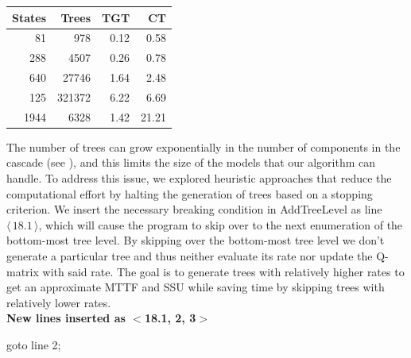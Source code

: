 \documentclass[12pt]{article}
\newcommand{\citeLine}[1]{$\langle \, #1 \, \rangle$}
\begin{document}
\noindent\begin{minipage}[c]{\textwidth}
	\centering
    \begin{tabular}{|r|r|r|r|}
    \hline
	    States & Trees  & TGT	& CT  \\ \hline
	    81    & 978    & 0.12 	& 0.58 \\ \hline
	    288   & 4507   & 0.26	& 0.78 \\ \hline
	    640   & 27746  & 1.64	& 2.48 \\ \hline
	    125   & 321372 & 6.22	& 6.69 \\ \hline
	    1944  & 6328   & 1.42	& 21.21 \\ \hline
	\end{tabular}
	\label{fig:table}
\end{minipage}

\vspace{1em}
The number of trees can grow exponentially in the number of components in the
cascade (see \cite{ING:2009}), and this limits the size of the models that our
algorithm can handle.  To address this issue, we explored heuristic approaches
that reduce the computational effort by halting the generation of trees based
on a stopping criterion. We insert the necessary breaking condition in
\mbox{AddTreeLevel} as line \citeLine{18.1}, which will cause the program to
skip over to the next enumeration of the bottom-most tree level. By skipping
over the bottom-most tree level we don't generate a particular tree and thus
neither evaluate its rate nor update the Q-matrix with said rate. The goal is
to generate trees with relatively higher rates to get an approximate MTTF and
SSU while saving time by skipping trees with relatively lower rates.
\\

\noindent\textbf{New lines inserted as $<$18.1, 2, 3$>$}
\begin{algorithmic}[1]
 	\STATE goto line 2;
\ENDIF
\end{algorithmic}
\end{document}
